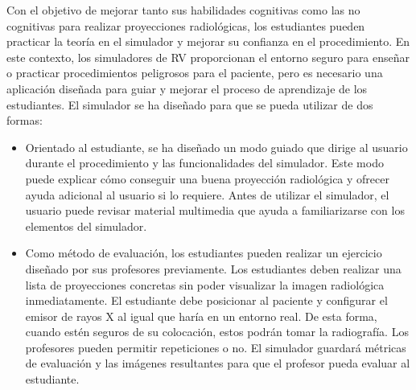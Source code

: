 Con el objetivo de mejorar tanto sus habilidades cognitivas como las no cognitivas para realizar proyecciones radiológicas, los estudiantes pueden practicar la teoría en el simulador y mejorar su confianza en el procedimiento. En este contexto, los simuladores de \ac{RV} proporcionan el entorno seguro para enseñar o practicar procedimientos peligrosos para el paciente, pero es necesario una aplicación diseñada para guiar y mejorar el proceso de aprendizaje de los estudiantes. El simulador se ha diseñado para que se pueda utilizar de dos formas:
\begin{itemize}
    \item Orientado al estudiante, se ha diseñado un modo guiado que dirige al usuario durante el procedimiento y las funcionalidades del simulador. Este modo puede explicar cómo conseguir una buena proyección radiológica y ofrecer ayuda adicional al usuario si lo requiere. Antes de utilizar el simulador, el usuario puede revisar material multimedia que ayuda a familiarizarse con los elementos del simulador.
    
    \item Como método de evaluación, los estudiantes pueden realizar un ejercicio diseñado por sus profesores previamente. Los estudiantes deben realizar una lista de proyecciones concretas sin poder visualizar la imagen radiológica inmediatamente. El estudiante debe posicionar al paciente y configurar el emisor de rayos X al igual que haría en un entorno real. De esta forma, cuando estén seguros de su colocación, estos podrán tomar la radiografía. Los profesores pueden permitir repeticiones o no. El simulador guardará métricas de evaluación y las imágenes resultantes para que el profesor pueda evaluar al estudiante.
    
\end{itemize}







